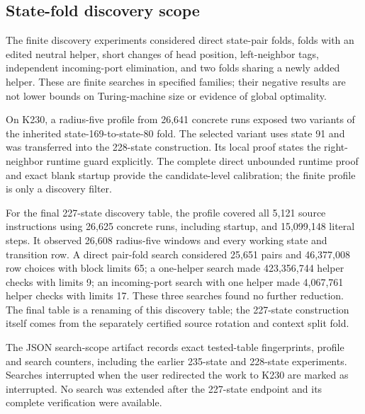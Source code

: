 \subsection{State-fold discovery scope}

The finite discovery experiments considered direct state-pair folds,
folds with an edited neutral helper, short changes of head position,
left-neighbor tags, independent incoming-port elimination, and two folds
sharing a newly added helper. These are finite searches in specified
families; their negative results are not lower bounds on Turing-machine
size or evidence of global optimality.

On K230, a radius-five profile from 26,641 concrete runs exposed two
variants of the inherited state-169-to-state-80 fold. The selected variant
uses state 91 and was transferred into the 228-state construction. Its
local proof states the right-neighbor runtime guard explicitly. The
complete direct unbounded runtime proof and exact blank startup provide
the candidate-level calibration; the finite profile is only a discovery
filter.

For the final 227-state discovery table, the profile covered all 5,121
source instructions using 26,625 concrete runs, including startup, and
15,099,148 literal steps. It observed 26,608 radius-five windows and every
working state and transition row. A direct pair-fold search considered
25,651 pairs and 46,377,008 row choices with block limits 65; a one-helper
search made 423,356,744 helper checks with limits 9; an incoming-port
search with one helper made 4,067,761 helper checks with limits 17. These
three searches found no further reduction. The final table is a renaming
of this discovery table; the 227-state construction itself comes from
the separately certified source rotation and context split fold.

The JSON search-scope artifact records exact tested-table fingerprints,
profile and search counters, including the earlier 235-state and
228-state experiments. Searches interrupted when the user redirected the
work to K230 are marked as interrupted. No search was extended after the
227-state endpoint and its complete verification were available.
